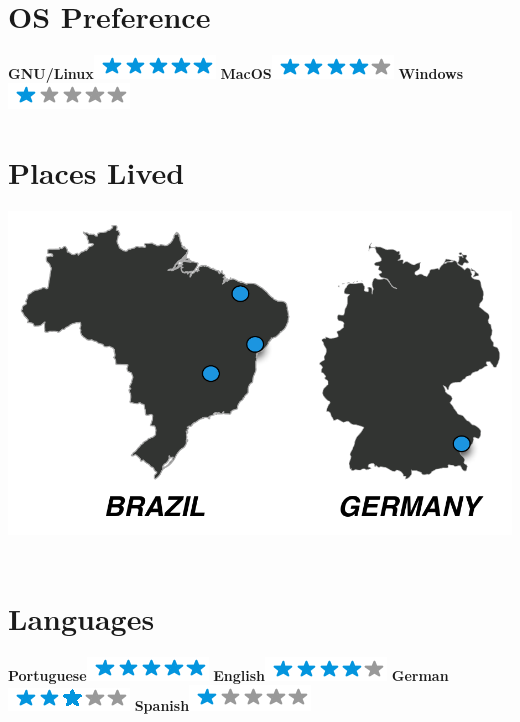 \documentclass[]{friggeri-cv}
\begin{document}
\begin{aside}
~
~
~
  \section{OS Preference}
    \textbf{GNU/Linux}\includegraphics[scale=0.40]{img/5stars.png}
    \textbf{MacOS}\includegraphics[scale=0.40]{img/4stars.png}
    \textbf{Windows}\includegraphics[scale=0.40]{img/1stars.png}
    ~
  \section{Places Lived}
    \includegraphics[scale=0.25]{img/places.pdf}
    ~
  \section{Languages}
    \textbf{Portuguese}\includegraphics[scale=0.40]{img/5stars.png}
    \textbf{English}\includegraphics[scale=0.40]{img/4stars.png}
    \textbf{German}\includegraphics[scale=0.40]{img/3stars.png}
    \textbf{Spanish}\includegraphics[scale=0.40]{img/1stars.png}
    ~
\end{aside}
\end{document}
